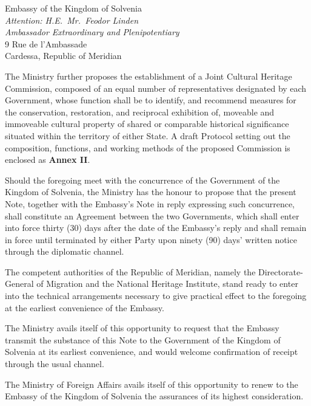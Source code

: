 \documentclass[%
  fontsize=11pt,
  paper=a4,
  parskip=half,
  fromalign=false,
  fromrule=false,
  fromphone=false,
  fromfax=false,
  fromemail=false,
  fromurl=false,
  addrfield=true,
  backaddress=false,
  subject=titled,
  foldmarks=false,
  refline=narrow,
  enlargefirstpage=false,
  pagenumber=botcenter
]{scrlttr2}
\begin{document}
\begin{letter}{%
Embassy of the Kingdom of Solvenia\\
\textit{Attention: H.E.\ Mr.\ Feodor Linden}\\
\textit{Ambassador Extraordinary and Plenipotentiary}\\
9 Rue de l'Ambassade\\
Cardessa, Republic of Meridian}
\begin{notepara}
\item The Ministry further proposes the establishment of a Joint Cultural
Heritage Commission, composed of an equal number of representatives
designated by each Government, whose function shall be to identify, and
recommend measures for the conservation, restoration, and reciprocal
exhibition of, moveable and immoveable cultural property of shared or
comparable historical significance situated within the territory of either
State. A draft Protocol setting out the composition, functions, and working
methods of the proposed Commission is enclosed as \textbf{Annex II}.

\item Should the foregoing meet with the concurrence of the Government of
the Kingdom of Solvenia, the Ministry has the honour to propose that the
present Note, together with the Embassy's Note in reply expressing such
concurrence, shall constitute an Agreement between the two Governments,
which shall enter into force thirty (30) days after the date of the
Embassy's reply and shall remain in force until terminated by either Party
upon ninety (90) days' written notice through the diplomatic channel.

\item The competent authorities of the Republic of Meridian, namely the
Directorate-General of Migration and the National Heritage Institute, stand
ready to enter into the technical arrangements necessary to give practical
effect to the foregoing at the earliest convenience of the Embassy.

\item The Ministry avails itself of this opportunity to request that the
Embassy transmit the substance of this Note to the Government of the Kingdom
of Solvenia at its earliest convenience, and would welcome confirmation of
receipt through the usual channel.

\end{notepara}

\closing{The Ministry of Foreign Affairs avails itself of this opportunity
to renew to the Embassy of the Kingdom of Solvenia the assurances of its
highest consideration.}


\end{letter}
\end{document}
